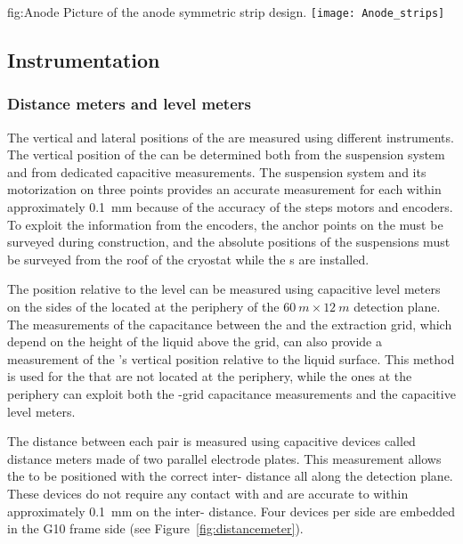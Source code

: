 \begin{dunefigure}
{fig:Anode}
{Picture of the anode symmetric \twod strip design.}
  \texttt{[image: Anode\_strips]}
\end{dunefigure}

\subsection{Instrumentation}
\label{sec:fddp-crp-instr}

\subsubsection{Distance meters and level meters}

The vertical and lateral positions of the  are measured using different instruments. 
The vertical position of the  can be determined both from the suspension system and from dedicated capacitive measurements.
The  suspension system and its motorization on three points provides an accurate measurement for each  within approximately \SI{0.1}{mm} because of the accuracy of the steps motors and encoders. 
To exploit the information from the encoders,  the anchor points on the  must be surveyed during construction, and the absolute positions of the suspensions must be surveyed from the roof of the cryostat while the \fdth{}s are installed. 

The position  relative to the  level can be measured using capacitive level meters on the sides of the  located at the periphery of the  $\SI{60}{m}\times\SI{12}{m}$ detection plane.  The  measurements of the capacitance between the  and the extraction grid, which depend on the height of the liquid above the grid, can also provide a  measurement  of the 's vertical position relative to the liquid surface. This method is used for the  that are not located at the periphery, while the ones at the periphery can exploit both the  -grid capacitance measurements and the capacitive level meters.
 
The distance between each  pair is measured using capacitive devices called distance meters made of two parallel electrode plates.  
This measurement allows the  to be positioned with the correct  inter- distance all along the detection plane. These devices do not require any contact with   and are accurate to within approximately \SI{0.1}{mm} on the  inter- distance.  Four devices per  side are embedded in the G10 frame side (see Figure~\ref{fig:distancemeter}).


